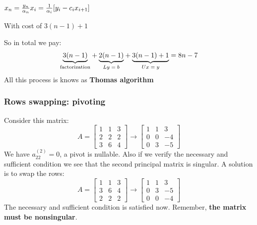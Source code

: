 \begin{itemize}
\begin{itemize}
            \begin{LARGE}
                $
                x_n=\frac{y_n}{\alpha_n}\\
                x_i=\frac{1}{\alpha_i}[y_i-c_ix_{i+1}]
                $
            \end{LARGE}

            \vspace{1em}
            With cost of $3(n-1)+1$

        \end{itemize}
        So in total we pay:
        $$
        \underlabel{3(n-1)}{factorization}+
        \underlabel{2(n-1)}{$Ly=b$}+
        \underlabel{3(n-1)+1}{$Ux=y$}=8n-7
        $$
        All this process is knows as \textbf{Thomas algorithm}
    \end{itemize}

\subsubsection{Rows swapping: pivoting}
    Consider this matrix:
    $$A=
    \begin{bmatrix}
        1&1&3\\
        2&2&2\\
        3&6&4
    \end{bmatrix}
    \rightarrow
    \begin{bmatrix}
        1&1&3\\
        0&0&-4\\
        0&3&-5
    \end{bmatrix}
    $$
    We have $a_{22}^{(2)}=0$, a pivot is nullable. Also if we verify the necessary and sufficient condition we see that the second principal matrix is singular. A solution is to swap the rows:
    $$A=
    \begin{bmatrix}
        1&1&3\\
        3&6&4\\
        2&2&2
    \end{bmatrix}
    \rightarrow
    \begin{bmatrix}
        1&1&3\\
        0&3&-5\\
        0&0&-4
    \end{bmatrix}
    $$
    The necessary and sufficient condition is satisfied now. Remember, \textbf{the matrix must be nonsingular}.
    
